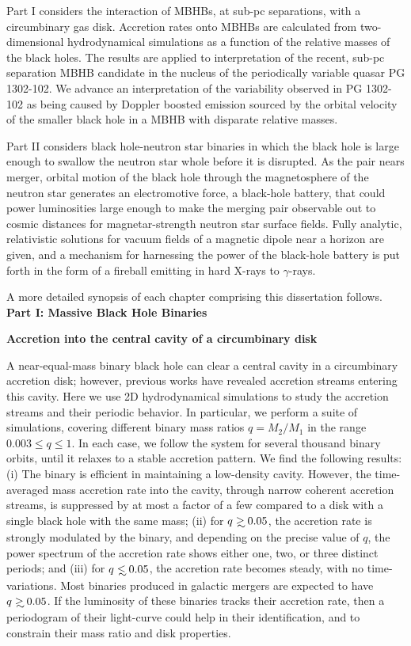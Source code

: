 \documentclass[12pt,letterpaper]{article}
\begin{document}
Part I considers the interaction of MBHBs, at sub-pc separations, with a
circumbinary gas disk. Accretion rates onto MBHBs are calculated from two-
dimensional hydrodynamical simulations as a function of the relative masses
of the black holes. The results are applied to interpretation of the recent,
sub-pc separation MBHB candidate in the nucleus of the periodically variable
quasar PG 1302-102. We advance an interpretation of the variability observed
in PG 1302-102 as being caused by Doppler boosted emission sourced by the
orbital velocity of the smaller black hole in a MBHB with disparate relative
masses.

Part II considers black hole-neutron star binaries in which the black hole is
large enough to swallow the neutron star whole before it is disrupted. As the
pair nears merger, orbital motion of the black hole through the magnetosphere
of the neutron star generates an electromotive force, a black-hole battery,
that could power luminosities large enough to make the merging pair observable
out to cosmic distances for magnetar-strength neutron star surface fields.
Fully analytic, relativistic solutions for vacuum fields of a magnetic dipole
near a horizon are given, and a mechanism for harnessing the power of the
black-hole battery is put forth in the form of a fireball emitting in hard
X-rays to $\gamma$-rays.


A more detailed synopsis of each chapter comprising this dissertation follows.
\\

\noindent
\textbf{Part I: Massive Black Hole Binaries}

\noindent
\textbf{Accretion into the central cavity of a circumbinary disk}

A near-equal-mass binary black hole can clear a central cavity in a
circumbinary accretion disk; however, previous works have revealed   accretion
streams entering this cavity.  Here we use 2D   hydrodynamical simulations to
study the accretion streams and their   periodic behavior.  In particular, we
perform a suite of   simulations, covering different binary mass ratios
$q=M_2/M_1$ in   the range $0.003 \leq q \leq 1$.  In each case, we follow the
system   for several thousand binary orbits, until it relaxes to a stable
accretion pattern.  We find the following results: (i) The   binary is
efficient in maintaining a low-density cavity. However, the time-averaged mass
accretion rate into the cavity, through narrow coherent accretion streams, is
suppressed by at most a factor of a few compared to a disk with a single black
hole with the same mass; (ii) for $q \gsim 0.05$, the accretion rate is
strongly modulated by the binary, and depending on the precise value   of $q$,
the power spectrum of the accretion rate shows either one,   two, or three
distinct periods; and (iii) for $q \lsim 0.05$, the   accretion rate becomes
steady, with no time-variations.  Most   binaries produced in galactic mergers
are expected to have $q\gsim   0.05$. If the luminosity of these binaries
tracks their accretion   rate, then a periodogram of their light-curve could
help in their   identification, and to constrain their mass ratio and disk
properties. \\
\end{document}
